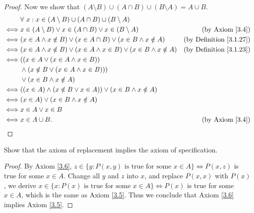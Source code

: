 \begin{proof}
    Now we show that \((A \setminus B) \cup (A \cap B) \cup (B \setminus A) = A \cup B\).
    \begin{align*}
             & \forall\ x : x \in (A \setminus B) \cup (A \cap B) \cup (B \setminus A)                                                       \\
        \iff & x \in (A \setminus B) \lor x \in (A \cap B) \lor x \in (B \setminus A)                  & \text{(by Axiom \ref{3.4})}         \\
        \iff & (x \in A \land x \notin B) \lor (x \in A \cap B) \lor (x \in B \land x \notin A)        & \text{(by Definition \ref{3.1.27})} \\
        \iff & (x \in A \land x \notin B) \lor (x \in A \land x \in B) \lor (x \in B \land x \notin A) & \text{(by Definition \ref{3.1.23})} \\
        \iff & ((x \in A \lor (x \in A \land x \in B))                                                                                       \\
             & \land (x \notin B \lor (x \in A \land x \in B)))                                                                              \\
             & \lor (x \in B \land x \notin A)                                                                                               \\
        \iff & ((x \in A) \land (x \notin B \lor x \in A)) \lor (x \in B \land x \notin A)                                                   \\
        \iff & (x \in A) \lor (x \in B \land x \notin A)                                                                                     \\
        \iff & x \in A \lor x \in B                                                                                                          \\
        \iff & x \in A \cup B.                                                                         & \text{(by Axiom \ref{3.4})}
    \end{align*}
\end{proof}

\begin{exercise}\label{ex 3.1.11}
    Show that the axiom of replacement implies the axiom of specification.
\end{exercise}

\begin{proof}
    By Axiom \ref{3.6}, \(z \in \{y : P(x, y) \text{ is true for some } x \in A\} \iff P(x, z)\) is true for some \(x \in A\).
    Change all \(y\) and \(z\) into \(x\), and replace \(P(x, x)\) with \(P(x)\), we derive \(x \in \{x : P(x) \text{ is true for some } x \in A\} \iff P(x)\) is true for some \(x \in A\), which is the same as Axiom \ref{3.5}.
    Thus we conclude that Axiom \ref{3.6} implies Axiom \ref{3.5}.
\end{proof}